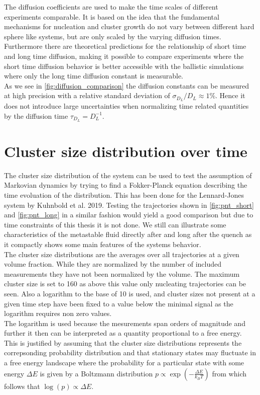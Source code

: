 The diffusion coefficients are used to make the time scales of different experiments comparable. It is based on the idea that the fundamental mechanisms for nucleation and cluster growth do not vary between different hard sphere like systems, but are only scaled by the varying diffusion times. Furthermore there are theoretical predictions for the relationship of short time and long time diffusion, making it possible to compare experiments where the short time diffusion behavior is better accessible with the ballistic simulations where only the long time diffusion constant is measurable.\\


As we see in \autoref{fig:diffusion_comparison} the diffusion constants can be measured at high precision with a relative standard deviation of $\sigma_{D_L}/D_L \approx 1\%$. Hence it does not introduce large uncertainties when normalizing time related quantities by the diffusion time $\tau_{D_L} = D_L^{-1}$.

\section{Cluster size distribution over time}
\label{sec:pnt}
The cluster size distribution of the system can be used to test the assumption of Markovian dynamics by trying to find a Fokker-Planck equation describing the time evoluation of the distribution. This has been done for the Lennard-Jones system by Kuhnbold et al. 2019\cite{Kuhnbold2019}. Testing the trajectories shown in \autoref{fig:pnt_short} and \autoref{fig:pnt_long} in a similar fashion would yield a good comparison but due to time constraints of this thesis it is not done. We still can illustrate some characteristics of the metastable fluid directly after and long after the quench as it compactly shows some main features of the systems behavior.\\ 

The cluster size distributions are the averages over all trajectories at a given volume fraction. While they are normalized by the number of included measurements they have not been normalized by the volume. The maximum cluster size is set to 160 as above this value only nucleating trajectories can be seen. Also a logarithm to the base of 10 is used, and cluster sizes not present at a given time step have been fixed to a value below the minimal signal as the logarithm requires non zero values.\\
The logarithm is used because the mesurements span orders of magnitude and further it then can be interpreted as a quantity proportional to a free energy. This is justified by assuming that the cluster size distributions represents the correpsonding probability distribution and that stationary states may fluctuate in a free energy landscape where the probability for a particular state with some energy $\Delta E$ is given by a Boltzmann distribution $p\propto \exp \left( - \frac{\Delta E}{k_B T} \right)$ from which follows that $\log(p) \propto \Delta E$.\\

